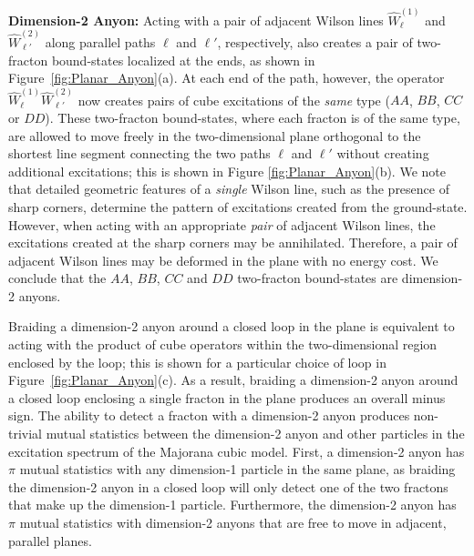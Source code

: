 \documentclass[aps,twocolumn,preprintnumbers,floatfix,showpacs,prx]{revtex4-1}
\begin{document}
{\bf Dimension-2 Anyon:}
Acting with a pair of adjacent Wilson lines $\hat{W}^{(1)}_{\ell}$ and $\hat{W}^{(2)}_{\ell'}$
along parallel paths $\ell$ and $\ell'$, respectively,
also creates a pair of two-fracton bound-states localized at the ends,
as shown in Figure~\ref{fig:Planar_Anyon}(a).
At each end of the path, however, the operator $\hat{W}^{(1)}_{\ell}\hat{W}^{(2)}_{\ell'}$
now creates pairs of cube excitations of the \emph{same} type ($AA$, $BB$, $CC$ or $DD$).
These two-fracton bound-states, where each fracton is of the same type,
are allowed to move freely in the two-dimensional plane orthogonal to the shortest line segment connecting the two paths $\ell$ and $\ell'$
without creating additional excitations; this is shown in Figure \ref{fig:Planar_Anyon}(b).
We note that detailed geometric features of a \emph{single} Wilson line, such as the presence of sharp corners, 
determine the pattern of excitations created from the ground-state.
However, when acting with an appropriate \emph{pair} of adjacent Wilson lines,
the excitations created at the sharp corners may be annihilated.
Therefore, a pair of adjacent Wilson lines may be deformed in the plane with no energy cost. 
We conclude that the $AA$, $BB$, $CC$ and $DD$ two-fracton bound-states are dimension-2 anyons.

Braiding a dimension-2 anyon around a closed loop in the plane
is equivalent to acting with the product of cube operators within the two-dimensional region enclosed by the loop;
this is shown for a particular choice of loop in Figure~\ref{fig:Planar_Anyon}(c).
As a result, braiding a dimension-2 anyon around a closed loop enclosing a single fracton in the plane
produces an overall minus sign.
The ability to detect a fracton with a dimension-2 anyon 
produces non-trivial mutual statistics between the dimension-2 anyon and other particles
in the excitation spectrum of the Majorana cubic model.
First, a dimension-2 anyon has $\pi$ mutual statistics with any dimension-1 particle in the same plane,
as braiding the dimension-2 anyon in a closed loop
will only detect one of the two fractons that make up the dimension-1 particle.
Furthermore, the dimension-2 anyon has 
$\pi$ mutual statistics with dimension-2 anyons that are free to move in adjacent, parallel planes. 
\end{document}
